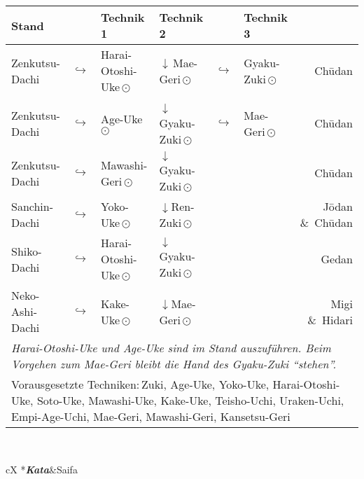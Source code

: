 	\begin{tcolorbox}[width=\textwidth,height=\textheight,right=12pt,left=12pt,colframe=BLBELT,colback=white,fonttitle=\bfseries,coltitle=white,title=4. Kyu:\indent Kihon-Ido Kata - Partnerformen - Erwartungshorizont]	
	\null\vfill\null
	\begin{tabularx}{\textwidth}{lllllXr}
		\textbf{Stand} 	&  	& \textbf{Technik 1} & \textbf{Technik 2} 				& &\textbf{Technik 3}&\\
		\midrule
		Zenkutsu-Dachi 	& \(\hookrightarrow\)	& Harai-Otoshi-Uke\,\(\odot\) 	& \(\downarrow\)\,Mae-Geri\,\(\odot\)	& \(\hookrightarrow\) 	& Gyaku-Zuki\,\(\odot\)	& Ch\={u}dan \\
		Zenkutsu-Dachi 	& \(\hookrightarrow\)	& Age-Uke\,\(\odot\) 			& \(\downarrow\)\,Gyaku-Zuki\,\(\odot\) & \(\hookrightarrow\)	& Mae-Geri\,\(\odot\)	& Ch\={u}dan \\
		Zenkutsu-Dachi 	& \(\hookrightarrow\)	& Mawashi-Geri\,\(\odot\) 		& \(\downarrow\)Gyaku-Zuki\,\(\odot\) 				&						&	 					& Ch\={u}dan \\
		Sanchin-Dachi 	& \(\hookrightarrow\)	& Yoko-Uke\,\(\odot\) 			& \(\downarrow\)Ren-Zuki\,\(\odot\) 					&						& 						& J\={o}dan \&~Ch\={u}dan \\
		Shiko-Dachi 	& \(\hookrightarrow\)	& Harai-Otoshi-Uke\,\(\odot\) 	& \(\downarrow\)Gyaku-Zuki\,\(\odot\) 				&						& 						& Gedan \\
		Neko-Ashi-Dachi	& \(\hookrightarrow\)	& Kake-Uke\,\(\odot\) 			& \(\downarrow\)Mae-Geri\,\(\odot\) 					&						& 						& Migi \&~Hidari  \\
		\multicolumn{7}{l}{{\scriptsize \textit{Harai-Otoshi-Uke und Age-Uke sind im Stand auszuführen. Beim Vorgehen zum Mae-Geri bleibt die Hand des Gyaku-Zuki \textquotedblleft{stehen}\textquotedblright .}}}\\
		\multicolumn{7}{p{\linewidth-2\tabcolsep}}{{\footnotesize Vorausgesetzte Techniken:\,Zuki, Age-Uke, Yoko-Uke, Harai-Otoshi-Uke, Soto-Uke, Mawashi-Uke, Kake-Uke, Teisho-Uchi, Uraken-Uchi, Empi-Age-Uchi, Mae-Geri, Mawashi-Geri, Kansetsu-Geri}}\\
		\midrule
	\end{tabularx}\\
	\null\vfill\null
	\begin{minipage}[t]{0.45\textwidth}
		\begin{tabularx}{\textwidth}{cX}
			\midrule
			*{\textbf{\textit{Kata}}}&Saifa\\

\end{tabularx}
\end{minipage}
\end{tcolorbox}
